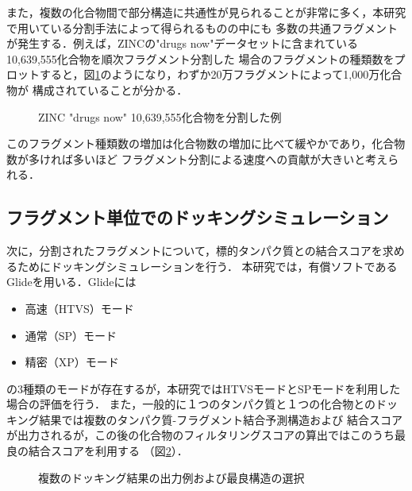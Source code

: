 また，複数の化合物間で部分構造に共通性が見られることが非常に多く，本研究で用いている分割手法によって得られるものの中にも
多数の共通フラグメントが発生する．例えば，ZINCの"drugs now"データセットに含まれている10,639,555化合物を順次フラグメント分割した
場合のフラグメントの種類数をプロットすると，図\ref{fig:decomposition_amount}のようになり，わずか20万フラグメントによって1,000万化合物が
構成されていることが分かる．
\begin{figure}[htp]
 \begin{center}
  \caption{ZINC "drugs now" 10,639,555化合物を分割した例}
  \label{fig:decomposition_amount}
 \end{center}
\end{figure}
このフラグメント種類数の増加は化合物数の増加に比べて緩やかであり，化合物数が多ければ多いほど
フラグメント分割による速度への貢献が大きいと考えられる．

\subsection{フラグメント単位でのドッキングシミュレーション}
次に，分割されたフラグメントについて，標的タンパク質との結合スコアを求めるためにドッキングシミュレーションを行う．
本研究では，有償ソフトであるGlide\cite{Friesner2004}を用いる．Glideには
\begin{itemize}
\item 高速（HTVS）モード
\item 通常（SP）モード
\item 精密（XP）モード
\end{itemize}
の3種類のモードが存在するが，本研究ではHTVSモードとSPモードを利用した場合の評価を行う．
また，一般的に１つのタンパク質と１つの化合物とのドッキング結果では複数のタンパク質-フラグメント結合予測構造および
結合スコアが出力されるが，この後の化合物のフィルタリングスコアの算出ではこのうち最良の結合スコアを利用する
（図\ref{fig:fragment_result}）．

\begin{figure}[t]
\begin{minipage}{0.5\hsize}
 \begin{center}
 \end{center}
\end{minipage}
\begin{minipage}{0.5\hsize}
 \begin{center}
 \end{center}
\end{minipage}
 \caption{複数のドッキング結果の出力例および最良構造の選択}
 \label{fig:fragment_result}
\end{figure}


